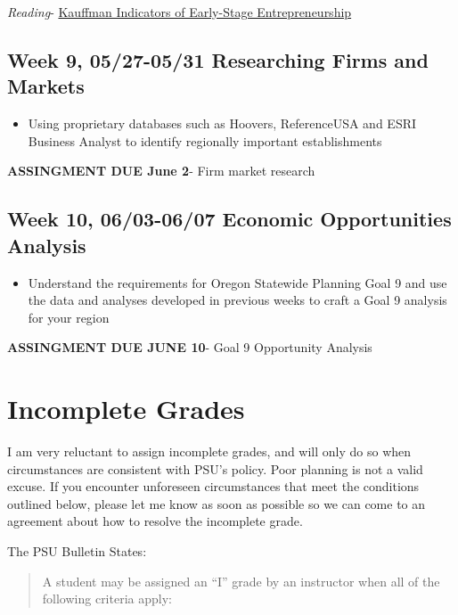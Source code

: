 \documentclass[11pt,]{article}
\providecommand{\tightlist}{%
  \setlength{\itemsep}{0pt}\setlength{\parskip}{0pt}}
\begin{document}
\emph{Reading}- \href{https://indicators.kauffman.org/}{Kauffman
Indicators of Early-Stage Entrepreneurship}

\hypertarget{week-9-0527-0531-researching-firms-and-markets}{%
\subsection{Week 9, 05/27-05/31 Researching Firms and
Markets}\label{week-9-0527-0531-researching-firms-and-markets}}

\begin{itemize}
\tightlist
\item
  Using proprietary databases such as Hoovers, ReferenceUSA and ESRI
  Business Analyst to identify regionally important establishments
\end{itemize}

\textbf{ASSINGMENT DUE June 2}- Firm market research

\hypertarget{week-10-0603-0607-economic-opportunities-analysis}{%
\subsection{Week 10, 06/03-06/07 Economic Opportunities
Analysis}\label{week-10-0603-0607-economic-opportunities-analysis}}

\begin{itemize}
\tightlist
\item
  Understand the requirements for Oregon Statewide Planning Goal 9 and
  use the data and analyses developed in previous weeks to craft a Goal
  9 analysis for your region
\end{itemize}

\textbf{ASSINGMENT DUE JUNE 10}- Goal 9 Opportunity Analysis

\hypertarget{incomplete-grades}{%
\section{Incomplete Grades}\label{incomplete-grades}}

I am very reluctant to assign incomplete grades, and will only do so
when circumstances are consistent with PSU's policy. Poor planning is
not a valid excuse. If you encounter unforeseen circumstances that meet
the conditions outlined below, please let me know as soon as possible so
we can come to an agreement about how to resolve the incomplete grade.

The PSU Bulletin States:

\begin{quote}
A student may be assigned an ``I'' grade by an instructor when all of
the following criteria apply:
\end{quote}
\end{document}
